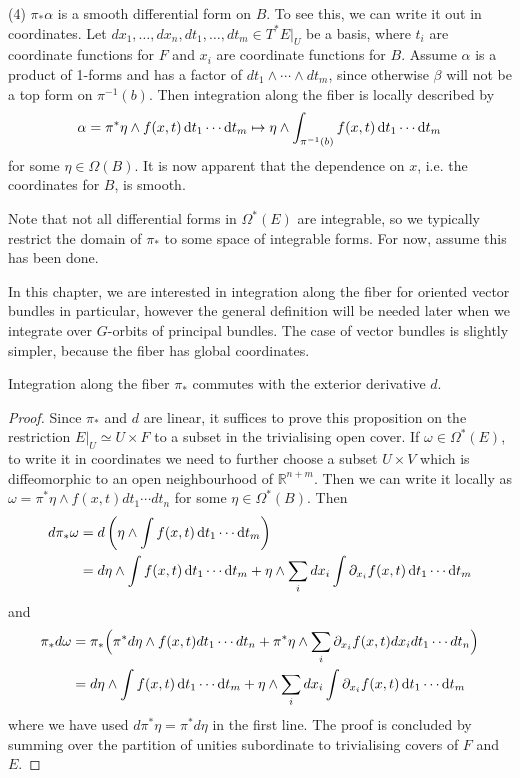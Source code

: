 (4) $\pi_*\alpha$ is a smooth differential form on $B$. To see this, we can
write it out in coordinates. Let 
$dx_1,\ldots,dx_{n},dt_1,\ldots,dt_m \in T^*E|_U$ be a basis, where
$t_i$ are coordinate functions for $F$ and $x_i$ are coordinate functions for
$B$. Assume $\alpha$ is a product of 1-forms and has a factor of 
$dt_1\wedge \cdots\wedge dt_m$, since
otherwise $\beta$ will not be a top form on $\pi^{-1}(b)$. Then integration
along the fiber is locally described by 
\[
\alpha = \pi^*\eta \wedge f(x,t) \odif{t_1}\cdots \odif{t_m}   
\mapsto \eta\wedge \int_{\pi^{-1}(b)} f(x,t) \odif{t_1}\cdots \odif{t_m}
\] 
for some $\eta\in \Omega(B)$. It is now apparent that the dependence on $x$,
i.e. the coordinates for  $B$, is smooth. 
\begin{remark}
	Note that not all differential forms in $\Omega^*(E)$ are integrable, 
	so we typically restrict the domain of $\pi_*$ to some space of integrable
	forms. For now, assume this has been done.
\end{remark}
In this chapter, we are interested in integration along the fiber for oriented
vector bundles in particular, however the general definition will be needed
later when we integrate over $G$-orbits of principal bundles. The case of vector
bundles is slightly simpler, because the fiber has global coordinates. 
\begin{prop} %
	Integration along the fiber $\pi_*$ commutes with the exterior derivative
	$d$.
\end{prop}
\begin{proof}
	Since $\pi_*$ and  $d$ are linear,
	it suffices to prove this proposition on the restriction $E|_U \simeq
	U\times F$ to a subset in the trivialising open cover. If $\omega\in
	\Omega^*(E)$, to write it in coordinates we need to further choose a
	subset $U\times V$ which is diffeomorphic to an open neighbourhood of
	$\mathbb{R}^{n+m}$. Then
	we can write it locally as $\omega = \pi^*\eta \wedge f(x,t) dt_1\cdots
	dt_n$ for some $\eta\in \Omega^*(B)$. Then 
	\begin{align*}
		d\pi_*\omega
		&= d \paren{\eta\wedge \int f(x,t)\odif{t_1}\cdots\odif{t_m} } \\
		&= d\eta\wedge\int f(x,t)\odif{t_1}\cdots\odif{t_m}  
		+\eta\wedge \sum_i dx_i\int \partial_{x_i} f(x,t)\odif{t_1}\cdots\odif{t_m} 
	\end{align*}
	and 
	\begin{align*}
		\pi_*d\omega
		&= \pi_*\paren[2]{\pi^*d\eta\wedge f(x,t) dt_1\cdots
		dt_n + \pi^*\eta \wedge\sum_i \partial_{x_i}f(x,t) dx_i dt_1\cdots
		dt_n } \\
		&= d\eta\wedge\int f(x,t)\odif{t_1}\cdots\odif{t_m} + \eta \wedge
		\sum_i dx_i\int \partial_{x_i} f(x,t)\odif{t_1}\cdots\odif{t_m} 
	\end{align*}
	where we have used $d\pi^*\eta = \pi^*d\eta$ in the first line. The proof is
	concluded by summing over the partition of unities subordinate to
	trivialising covers of $F$ and $E$.
\end{proof}
